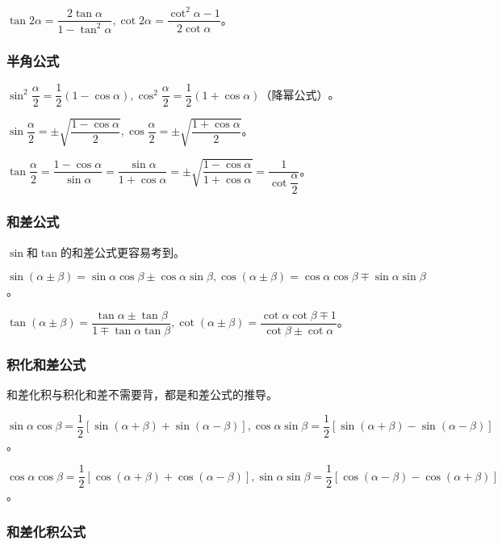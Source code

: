 \documentclass[UTF8, 12pt]{ctexart}
\begin{document}
        $\tan 2\alpha=\dfrac{2\tan\alpha}{1-\tan^2\alpha},\cot 2\alpha=\dfrac{\cot^2\alpha-1}{2\cot\alpha}$。

        \subsubsection{半角公式}

        $\sin^2\dfrac{\alpha}{2}=\dfrac{1}{2}(1-\cos\alpha),\cos^2\dfrac{\alpha}{2}=\dfrac{1}{2}(1+\cos\alpha)\text{（降幂公式）}$。

        $\sin\dfrac{\alpha}{2}=\pm\sqrt{\dfrac{1-\cos\alpha}{2}},\cos\dfrac{\alpha}{2}=\pm\sqrt{\dfrac{1+\cos\alpha}{2}}$。

        $\tan\dfrac{\alpha}{2}=\dfrac{1-\cos\alpha}{\sin\alpha}=\dfrac{\sin\alpha}{1+\cos\alpha}=\pm\sqrt{\dfrac{1-\cos\alpha}{1+\cos\alpha}}=\dfrac{1}{\cot\dfrac{\alpha}{2}}$。

        \subsubsection{和差公式}

        $\sin$和$\tan$的和差公式更容易考到。

        $\sin(\alpha\pm\beta)=\sin\alpha\cos\beta\pm\cos\alpha\sin\beta,\cos(\alpha\pm\beta)=\cos\alpha\cos\beta\mp\sin\alpha\sin\beta$。

        $\tan(\alpha\pm\beta)=\dfrac{\tan\alpha\pm\tan\beta}{1\mp\tan\alpha\tan\beta},\cot(\alpha\pm\beta)=\dfrac{\cot\alpha\cot\beta\mp 1}{\cot\beta\pm\cot\alpha}$。

        \subsubsection{积化和差公式}

        和差化积与积化和差不需要背，都是和差公式的推导。

        $\sin\alpha\cos\beta=\dfrac{1}{2}[\sin(\alpha+\beta)+\sin(\alpha-\beta)],\cos\alpha\sin\beta=\dfrac{1}{2}[\sin(\alpha+\beta)-\sin(\alpha-\beta)]$。

        $\cos\alpha\cos\beta=\dfrac{1}{2}[\cos(\alpha+\beta)+\cos(\alpha-\beta)],\sin\alpha\sin\beta=\dfrac{1}{2}[\cos(\alpha-\beta)-\cos(\alpha+\beta)]$。

        \subsubsection{和差化积公式}
\end{document}

